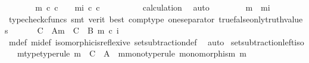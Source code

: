 \begin{isabellebody}
\ \ \ \ \isamarkupfalse%
\ \isamarkupfalse%
\ {\isachardoublequoteopen}{\isacharparenleft}{\kern0pt}{\isasymchi}m\ {\isasymcirc}\isactrlsub c\ c\ {\isacharequal}{\kern0pt}\ {\isasymt}{\isacharparenright}{\kern0pt}\ {\isacharequal}{\kern0pt}\ {\isacharparenleft}{\kern0pt}{\isasymchi}mi\ {\isasymcirc}\isactrlsub c\ c\ {\isacharequal}{\kern0pt}\ {\isasymt}{\isacharparenright}{\kern0pt}{\isachardoublequoteclose}\isanewline
\ \ \ \ \ \ \isamarkupfalse%
\ calculation\ \isamarkupfalse%
\ auto\isanewline
\ \ \isamarkupfalse%
\isanewline
\ \ \isamarkupfalse%
\ \isamarkupfalse%
\ {\isachardoublequoteopen}{\isasymchi}m\ {\isacharequal}{\kern0pt}\ {\isasymchi}mi{\isachardoublequoteclose}\isanewline
\ \ \ \ \isamarkupfalse%
\ {\isacharparenleft}{\kern0pt}typecheck{\isacharunderscore}{\kern0pt}cfuncs{\isacharcomma}{\kern0pt}\ smt\ {\isacharparenleft}{\kern0pt}verit{\isacharcomma}{\kern0pt}\ best{\isacharparenright}{\kern0pt}\ comp{\isacharunderscore}{\kern0pt}type\ one{\isacharunderscore}{\kern0pt}separator\ true{\isacharunderscore}{\kern0pt}false{\isacharunderscore}{\kern0pt}only{\isacharunderscore}{\kern0pt}truth{\isacharunderscore}{\kern0pt}values{\isacharparenright}{\kern0pt}\ \isanewline
\ \ \isamarkupfalse%
\ \isamarkupfalse%
\ {\isachardoublequoteopen}C\ {\isasymsetminus}\ {\isacharparenleft}{\kern0pt}A{\isacharcomma}{\kern0pt}m{\isacharparenright}{\kern0pt}\ {\isacharequal}{\kern0pt}\ C\ {\isasymsetminus}\ {\isacharparenleft}{\kern0pt}B{\isacharcomma}{\kern0pt}\ m\ {\isasymcirc}\isactrlsub c\ i{\isacharparenright}{\kern0pt}{\isachardoublequoteclose}\isanewline
\ \ \ \ \isamarkupfalse%
\ {\isasymchi}m{\isacharunderscore}{\kern0pt}def\ {\isasymchi}mi{\isacharunderscore}{\kern0pt}def\ isomorphic{\isacharunderscore}{\kern0pt}is{\isacharunderscore}{\kern0pt}reflexive\ set{\isacharunderscore}{\kern0pt}subtraction{\isacharunderscore}{\kern0pt}def\ \isamarkupfalse%
\ auto\isanewline
{}\isamarkupfalse%
%
\endisatagproof
{\isafoldproof}%
%
\isadelimproof
\isanewline
%
\endisadelimproof
\isanewline
{}\isamarkupfalse%
\ set{\isacharunderscore}{\kern0pt}subtraction{\isacharunderscore}{\kern0pt}left{\isacharunderscore}{\kern0pt}iso{\isacharcolon}{\kern0pt}\isanewline
\ \ \ m{\isacharunderscore}{\kern0pt}type{\isacharbrackleft}{\kern0pt}type{\isacharunderscore}{\kern0pt}rule{\isacharbrackright}{\kern0pt}{\isacharcolon}{\kern0pt}\ {\isachardoublequoteopen}m\ {\isacharcolon}{\kern0pt}\ C\ {\isasymrightarrow}\ A{\isachardoublequoteclose}\ \ m{\isacharunderscore}{\kern0pt}mono{\isacharbrackleft}{\kern0pt}type{\isacharunderscore}{\kern0pt}rule{\isacharbrackright}{\kern0pt}{\isacharcolon}{\kern0pt}\ {\isachardoublequoteopen}monomorphism\ m{\isachardoublequoteclose}\isanewline

\end{isabellebody}
